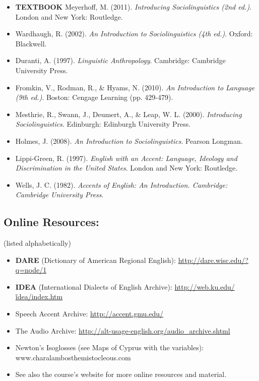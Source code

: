 \documentclass[listof=flat,letterpaper,11pt,abstract=true]{article}
\begin{document}
\begin{itemize}
\item \textbf{TEXTBOOK} Meyerhoff, M. (2011). \emph{Introducing Sociolinguistics (2nd ed.)}. London and New York: Routledge.
\item Wardhaugh, R. (2002). \emph{An Introduction to Sociolinguistics (4th ed.)}. Oxford: Blackwell.
\item Duranti, A. (1997). \emph{Linguistic Anthropology}. Cambridge: Cambridge University Press.
\item Fromkin, V., Rodman, R., \& Hyams, N. (2010). \emph{An Introduction to Language (9th ed.)}. Boston: Cengage Learning (pp. 429-479).
\item Mesthrie, R., Swann, J., Deumert, A., \& Leap, W. L. (2000). \emph{Introducing Sociolinguistics}. Edinburgh: Edinburgh University Press.
\item Holmes, J. (2008). \emph{An Introduction to Sociolinguistics}. Pearson Longman.
\item Lippi-Green, R. (1997). \emph{English with an Accent: Language, Ideology and Discrimination in the United States}. London and New York: Routledge.
\item Wells, J. C. (1982). \emph{Accents of English: An Introduction. Cambridge: Cambridge University Press}.
\end{itemize}
\subsection{Online Resources:}
\label{sec-2-2}

(listed alphabetically)
\begin{itemize}
\item \textbf{DARE} (Dictionary of American Regional English): \href{http://dare.wisc.edu/?q=node/1}{http://dare.wisc.edu/?q=node/1}
\item \textbf{IDEA} (International Dialects of English Archive): \href{http://web.ku.edu/~idea/index.htm}{http://web.ku.edu/\~idea/index.htm}
\item Speech Accent Archive: \href{http://accent.gmu.edu/}{http://accent.gmu.edu/}
\item The Audio Archive: \href{http://alt-usage-english.org/audio_archive.shtml}{http://alt-usage-english.org/audio\_archive.shtml}
\item Newton’s Isoglosses (see Maps of Cyprus with the variables):  www.charalambosthemistocleous.com
\item See also the course’s website for more online resources and material.
\end{itemize}
\end{document}
